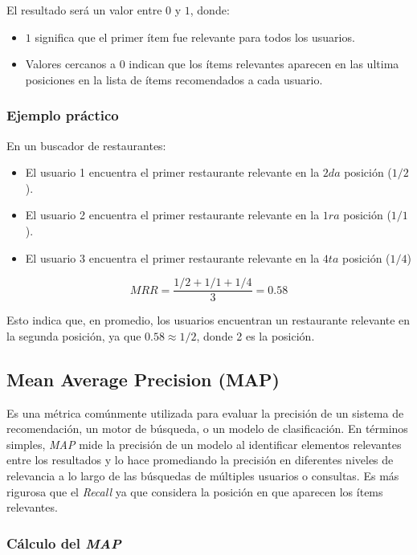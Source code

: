 \documentclass[11pt,a4paper,twoside]{thesis}
\begin{document}
El resultado será un valor entre $0$ y $1$, donde:
\begin{itemize}
	\item $1$ significa que el primer ítem fue relevante para todos los usuarios.
	\item Valores cercanos a $0$ indican que los ítems relevantes aparecen en las ultima posiciones en la lista de ítems recomendados a cada usuario.
\end{itemize}


\subsubsection{Ejemplo práctico}

En un buscador de restaurantes:
\begin{itemize}
	\item El usuario 1 encuentra el primer restaurante relevante en la $2da$ posición ($1/2$).
	\item El usuario 2 encuentra el primer restaurante relevante en la $1ra$ posición ($1/1$).
	\item El usuario 3 encuentra el primer restaurante relevante en la $4ta$ posición ($1/4$)
\end{itemize}

\begin{equation}
	MRR = \frac{1/2 + 1/1 + 1/4}{3} = 0.58
\end{equation}

Esto indica que, en promedio, los usuarios encuentran un restaurante relevante en la segunda posición, ya que $0.58 \approx 1/2$, donde 2 es la posición.


\subsection{Mean Average Precision (MAP)}

Es una métrica comúnmente utilizada para evaluar la precisión de un sistema de recomendación, un motor de búsqueda, o un modelo de clasificación. En términos simples, \textit{MAP} mide la precisión de un modelo al identificar elementos relevantes entre los resultados y lo hace promediando la precisión en diferentes niveles de relevancia a lo largo de las búsquedas de múltiples usuarios o consultas. Es más rigurosa que el \textit{Recall} ya que considera la posición en que aparecen los ítems relevantes.

\subsubsection{Cálculo del \textit{MAP}}
\end{document}
